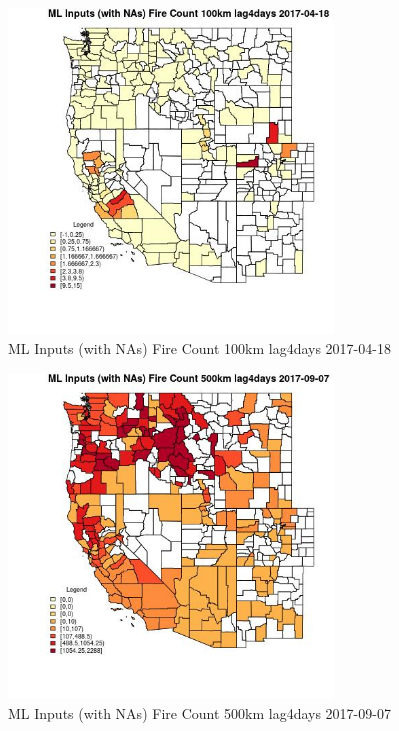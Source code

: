 \begin{figure} 
\centering  
\includegraphics[width=0.77\textwidth]{Code_Outputs/Report_ML_input_PM25_Step4_part_e_de_duplicated_aves_compiled_2019-05-20wNAs_CountyFire_Count_100km_lag4daysMean2017-04-18.jpg} 
\caption{\label{fig:Report_ML_input_PM25_Step4_part_e_de_duplicated_aves_compiled_2019-05-20wNAsCountyFire_Count_100km_lag4daysMean2017-04-18}ML Inputs (with NAs) Fire Count 100km lag4days 2017-04-18} 
\end{figure} 
 

\begin{figure} 
\centering  
\includegraphics[width=0.77\textwidth]{Code_Outputs/Report_ML_input_PM25_Step4_part_e_de_duplicated_aves_compiled_2019-05-20wNAs_CountyFire_Count_500km_lag4daysMean2017-09-07.jpg} 
\caption{\label{fig:Report_ML_input_PM25_Step4_part_e_de_duplicated_aves_compiled_2019-05-20wNAsCountyFire_Count_500km_lag4daysMean2017-09-07}ML Inputs (with NAs) Fire Count 500km lag4days 2017-09-07} 
\end{figure} 
 

